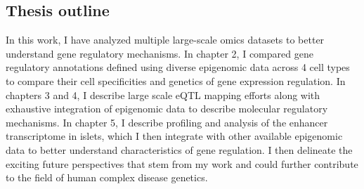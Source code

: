 \subsection{Thesis outline}
In this work, I have analyzed multiple large-scale omics datasets to better understand gene regulatory mechanisms. In chapter 2, I compared gene regulatory annotations defined using diverse epigenomic data across 4 cell types to compare their cell specificities and genetics of gene expression regulation. In chapters 3 and 4, I describe large scale eQTL mapping efforts along with exhaustive integration of epigenomic data to describe molecular regulatory mechanisms. In chapter 5, I describe profiling and analysis of the enhancer transcriptome in islets, which I then integrate with other available epigenomic data to better understand characteristics of gene regulation. I then delineate the exciting future perspectives that stem from my work and could further contribute to the field of human complex disease genetics.